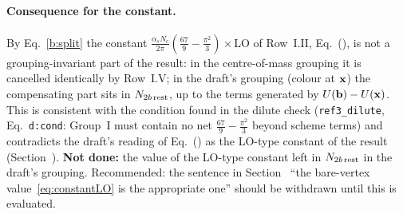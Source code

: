\paragraph{Consequence for the constant.}\label{sec:b-const} By Eq.~\eqref{b:split} the constant $\frac{\alpha_sN_c}{2\pi}(\frac{67}{9}-\frac{\pi^2}{3})\times$LO of Row~I.II, Eq.~(), is not a grouping-invariant part of the result: in the centre-of-mass grouping it is cancelled identically by Row~I.V; in the draft's grouping (colour at $\mathbf{x}$) the compensating part sits in $N_{2b\,\rm rest}$, up to the terms generated by $U(\mathbf{b})-U(\mathbf{x})$. This is consistent with the condition found in the dilute check (\texttt{ref3\_dilute}, Eq.~\texttt{d:cond}: Group~I must contain no net $\frac{67}{9}-\frac{\pi^2}{3}$ beyond scheme terms) and contradicts the draft's reading of Eq.~() as the LO-type constant of the result (Section~). \textbf{Not done:} the value of the LO-type constant left in $N_{2b\,\rm rest}$ in the draft's grouping. Recommended: the sentence in Section~ ``the bare-vertex value~\eqref{eq:constantLO} is the appropriate one'' should be withdrawn until this is evaluated.

